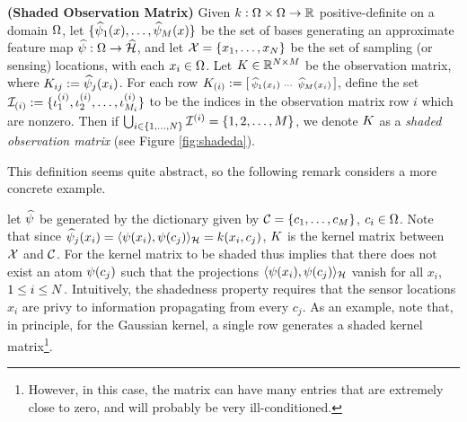 \begin{definition}\label{def:shaded}
\textbf{(Shaded Observation Matrix)} Given $k:\Omega\times\Omega\to\mathbb{R}$ positive-definite on a domain $\Omega$, let $\{\widehat{\psi}_1(x), \dots, \widehat{\psi}_{M}(x)\}$ be the set of bases generating an approximate feature map $\widehat{\psi}:\Omega\to\widehat{\mathcal{H}}$, and let
$\mathcal{X} = \{x_1, \dots, x_{N}\}$ be the set of sampling (or sensing) locations, with each $x_i\in\Omega$. 
Let $K\in\mathbb{R}^{N\times M}$ be the observation matrix, where $ K_{ij} := \widehat{\psi}_j(x_i)$. For each
row $K_{(i)} := \left[\begin{smallmatrix}
  \widehat{\psi}_1(x_i) & \cdots & \widehat{\psi}_{M}(x_i)
 \end{smallmatrix}\right]$, define the set 
$\mathcal{I}_{(i)} := \{\iota_1^{(i)},\iota_2^{(i)},\dots, \iota_{M_i}^{(i)}\}$ to be the indices in the observation
matrix row $i$ which are nonzero. 
Then if 
$\bigcup_{i\in\{1,\dots,N\}} \mathcal{I}^{(i)} = \{1,2,\dots, M\}$,
we denote $K$ as a \emph{shaded observation matrix} (see Figure \ref{fig:shadeda}).
\end{definition}
This definition seems quite abstract, so the following remark considers a more concrete example.
\begin{remark}\label{rem:shaded}
 let $\widehat{\psi}$ be generated by the dictionary given by $\mathcal{C} = \{c_1,\dots,c_{M}\}$, $c_i\in\Omega$. Note that since $\widehat{\psi}_j(x_i) = \langle\psi(x_i), \psi(c_j)\rangle_{\mathcal{H}} = k(x_i,c_j)$, $K$ is the kernel matrix between $\mathcal{X}$ and $\mathcal{C}$. For the kernel matrix to be shaded thus implies that there does not exist an atom $\psi(c_j)$ such that the projections $\langle\psi(x_i),\psi(c_j)\rangle_{\mathcal{H}}$ vanish for all $x_i$, $1\leq i\leq N$. Intuitively, the shadedness property requires that the sensor locations $x_i$ are privy to information propagating from every $c_j$. As an example, note that, in principle, for the Gaussian kernel, a single row generates a shaded kernel matrix\footnote{However, in this case, the matrix can have many entries that are extremely close to zero, and will probably be very ill-conditioned.}.  
\end{remark}
